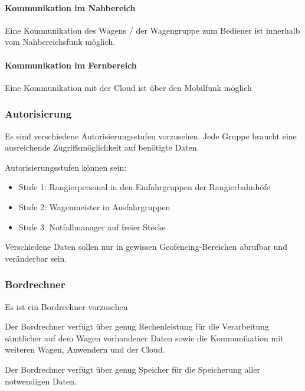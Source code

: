 \paragraph{Kommunikation im Nahbereich}
\begin{feat}
Eine Kommunikation des Wagens / der Wagengruppe zum Bediener ist innerhalb vom Nahbereichsfunk möglich.
\end{feat}

\paragraph{Kommunikation im Fernbereich}
\begin{feat}
Eine Kommunikation mit der Cloud ist über den Mobilfunk möglich
\end{feat}

\subsubsection{Autorisierung}
\begin{feat}
Es sind verschiedene Autorisierungsstufen vorzusehen. Jede Gruppe braucht eine ausreichende Zugriffsmöglichkeit auf benötigte Daten.
\end{feat}
\begin{rem} [zu Anf. 37]
Autorisierungsstufen können sein:
\begin{itemize}
    \item Stufe 1: Rangierpersonal in den Einfahrgruppen der Rangierbahnhöfe
    \item Stufe 2: Wagenmeister in Ausfahrgruppen
    \item Stufe 3: Notfallmanager auf freier Stecke
\end{itemize}
\end{rem}
\begin{rem} [zu Anf. 37]
Verschiedene Daten sollen nur in gewissen Geofencing-Bereichen abrufbar und veränderbar sein.
\end{rem}

\subsubsection{Bordrechner}
\begin{feat}
Es ist ein Bordrechner vorzusehen
\end{feat}
\begin{feat}
Der Bordrechner verfügt über genug Rechenleistung für die Verarbeitung sämtlicher auf dem Wagen vorhandener Daten sowie die Kommunikation mit weiteren Wagen, Anwendern und der Cloud.
\end{feat}
\begin{feat}
Der Bordrechner verfügt über genug Speicher für die Speicherung aller notwendigen Daten.
\end{feat}

